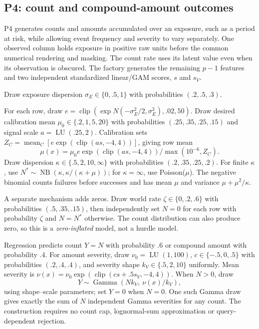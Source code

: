 \documentclass[11pt]{article}
\begin{document}
\subsection{P4: count and compound-amount outcomes}

P4 generates counts and amounts accumulated over an exposure, such as a period at risk, while allowing event frequency and severity to vary separately. One observed column holds exposure in positive raw units before the common numerical rendering and masking. The count rate uses its latent value even when its observation is obscured. The factory generates the remaining $p-1$ features and two independent standardized linear/GAM scores, $s$ and $s_V$.

Draw exposure dispersion $\sigma_E\in\{0,.5,1\}$ with probabilities $(.2,.5,.3)$.

For each row, draw $e=\operatorname{clip}(\exp N(-\sigma_E^2/2,\sigma_E^2),.02,50)$. Draw desired calibration mean $\mu_0\in\{.2,1,5,20\}$ with probabilities $(.25,.35,.25,.15)$ and signal scale $a=\operatorname{LU}(.25,2)$. Calibration sets $Z_C=\operatorname{mean}_{C}[e\exp(\operatorname{clip}(as,-4,4))]$, giving row mean
\[
\mu(x)=\mu_0 e\exp(\operatorname{clip}(as,-4,4))/\max(10^{-6},Z_C).
\]
Draw dispersion $\kappa\in\{.5,2,10,\infty\}$ with probabilities $(.2,.35,.25,.2)$. For finite $\kappa$, use $N^*\sim\operatorname{NB}(\kappa,\kappa/(\kappa+\mu))$; for $\kappa=\infty$, use Poisson($\mu$). The negative binomial counts failures before successes and has mean $\mu$ and variance $\mu+\mu^2/\kappa$.

A separate mechanism adds zeros. Draw world rate $\zeta\in\{0,.2,.6\}$ with probabilities $(.5,.35,.15)$, then independently set $N=0$ for each row with probability $\zeta$ and $N=N^*$ otherwise. The count distribution can also produce zero, so this is a \emph{zero-inflated} model, not a hurdle model.

Regression predicts count $Y=N$ with probability $.6$ or compound amount with probability $.4$. For amount severity, draw $\nu_0=\operatorname{LU}(1,100)$, $c\in\{-.5,0,.5\}$ with probabilities $(.2,.4,.4)$, and severity shape $k_V\in\{.5,2,10\}$ uniformly. Mean severity is $\nu(x)=\nu_0\exp(\operatorname{clip}(cs+.5s_V,-4,4))$. When $N>0$, draw
\[
Y\sim\operatorname{Gamma}(Nk_V,\ \nu(x)/k_V),
\]
using shape--scale parameters; set $Y=0$ when $N=0$. One such Gamma draw gives exactly the sum of $N$ independent Gamma severities for any count. The construction requires no count cap, lognormal-sum approximation or query-dependent rejection.
\end{document}
